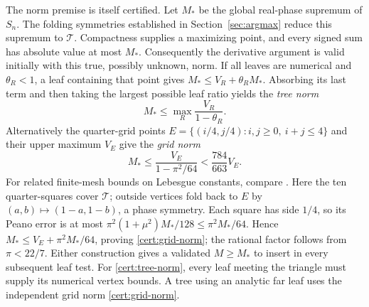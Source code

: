 The norm premise is itself certified. Let $M_*$ be the global real-phase
supremum of $S_n$. The folding symmetries established in
Section~\ref{sec:argmax} reduce this supremum to $\mathcal T$.
Compactness supplies a maximizing point, and every signed sum has
absolute value at most $M_*$. Consequently the derivative argument is
valid initially with this true, possibly unknown, norm. If all leaves
are numerical and $\theta_R<1$, a leaf containing that point gives
$M_*\leq V_R+\theta_RM_*$. Absorbing its last term and then taking
the largest possible leaf ratio yields the \emph{tree norm}
\begin{equation}\label{cert:tree-norm}
 M_*\leq\max_R\frac{V_R}{1-\theta_R}.
\end{equation}
Alternatively the quarter-grid points
$E=\{(i/4,j/4):i,j\geq0,\ i+j\leq4\}$ and their upper maximum $V_E$
give the \emph{grid norm}
\begin{equation}\label{cert:grid-norm}
 M_*\leq\frac{V_E}{1-\pi^2/64}<\frac{784}{663}V_E.
\end{equation}
For related finite-mesh bounds on Lebesgue constants, compare
\cite[Proposition~2.2]{Mesh2024}. Here the ten quarter-squares cover
$\mathcal T$; outside vertices fold
back to $E$ by $(a,b)\mapsto(1-a,1-b)$, a phase symmetry.
Each square has side $1/4$, so its Peano error is at most
$\pi^2(1+\mu^2)M_*/128\leq\pi^2M_*/64$. Hence
$M_*\leq V_E+\pi^2M_*/64$, proving \eqref{cert:grid-norm}; the
rational factor follows from $\pi<22/7$. Either construction gives a
validated $M\geq M_*$ to insert in every subsequent leaf test.
For \eqref{cert:tree-norm}, every leaf meeting the triangle must
supply its numerical vertex bounds. A tree using an analytic far leaf
uses the independent grid norm \eqref{cert:grid-norm}.

